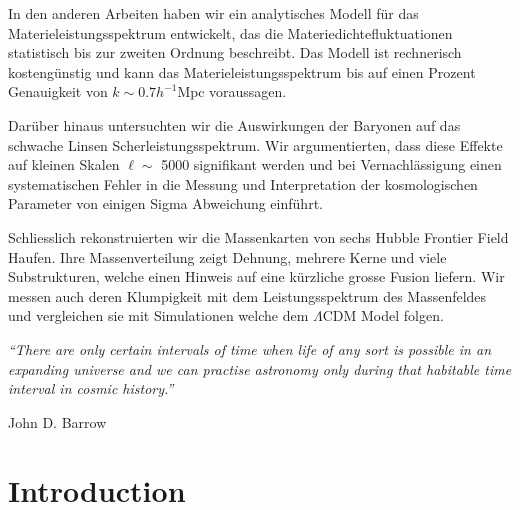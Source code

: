 \documentclass[
  11pt,
  twoside,
  openright,
  titlepage,
  headings=optiontoheadandtoc
]{scrbook}
\begin{document}
In den anderen Arbeiten haben wir ein analytisches Modell f{\"u}r das
Materieleistungsspektrum entwickelt, das die Materiedichtefluktuationen
statistisch bis zur zweiten Ordnung beschreibt.
Das Modell ist  rechnerisch kosteng{\"u}nstig und kann das
Materieleistungsspektrum bis auf einen Prozent Genauigkeit von
$k \sim 0.7 h^{- 1} \mathrm{Mpc}$ voraussagen.

Dar{\"u}ber hinaus untersuchten wir die Auswirkungen der Baryonen auf das
schwache Linsen Scherleistungsspektrum. Wir argumentierten, dass diese Effekte
auf kleinen Skalen $\ell \sim$ 5000 signifikant werden und bei
Vernachl{\"a}ssigung einen systematischen Fehler in die Messung und
Interpretation der kosmologischen Parameter von einigen Sigma Abweichung
einf{\"u}hrt.

Schliesslich rekonstruierten wir die Massenkarten von sechs Hubble
Frontier Field Haufen. Ihre Massenverteilung zeigt Dehnung, mehrere Kerne und
viele Substrukturen, welche einen Hinweis auf eine k\"urzliche grosse Fusion
liefern. Wir messen auch deren Klumpigkeit mit dem
Leistungsspektrum des Massenfeldes und vergleichen sie mit Simulationen welche
dem $\Lambda$CDM Model folgen.

\endgroup

\cleardoublepage
\thispagestyle{empty}

\vspace*{0.32\textheight}

\begin{flushright}
  \begin{minipage}{0.78\textwidth}
    \large\itshape
    ``There are only certain intervals of time when life of any sort is
    possible in an expanding universe and we can practise astronomy only
    during that habitable time interval in cosmic history.''

    \vspace{1.2em}

    \begin{flushright}
      \normalfont\small John D. Barrow
    \end{flushright}
  \end{minipage}
\end{flushright}

\cleardoublepage
{}
\setcounter{mainmatterpage}{\value{page}}
\mainmatter
\setcounter{page}{\value{mainmatterpage}}

\chapter{Introduction}\label{Introduction}
\end{document}
